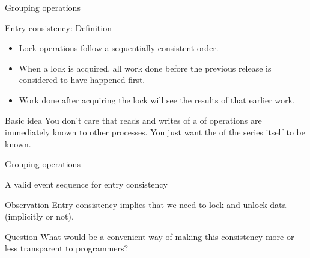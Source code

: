 \begin{slide}{Grouping operations}
  \begin{block}{Entry consistency: Definition}
    \begin{itemize}
      \item Lock operations follow a sequentially consistent order.
      \item When a lock is acquired, all work done before the previous release is considered to have happened first.
      \item Work done after acquiring the lock will see the results of that earlier work.
    \end{itemize}
  \end{block}
  \onslide
  \begin{block}{Basic idea} 
    You don't care that reads and writes of a  of operations are immediately known to other
    processes. You just want the  of the series itself to be known.
  \end{block}
\end{slide}
\begin{slide}{Grouping operations}
  \begin{block}{A valid event sequence for entry consistency}
    \begin{center}
    \end{center}
  \end{block}
  \begin{block}{Observation} 
    Entry consistency implies that we need to lock and unlock data (implicitly or not).
  \end{block}
  \begin{block}{Question}
    What would be a convenient way of making this consistency more or less transparent to programmers?
  \end{block}
\end{slide}
